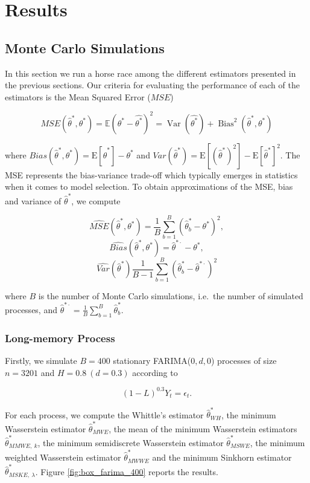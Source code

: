 \documentclass[
  11pt,
]{article}
\begin{document}
\hypertarget{results}{%
\section{Results}\label{results}}

\hypertarget{monte-carlo-simulations}{%
\subsection{Monte Carlo Simulations}\label{monte-carlo-simulations}}

In this section we run a horse race among the different estimators
presented in the previous sections. Our criteria for evaluating the
performance of each of the estimators is the Mean Squared Error
(\(MSE\))

\[MSE(\hat \theta^*, \theta^*) = \mathbb{E}(\theta^*-\hat{\theta^*})^{2} = \operatorname{Var}(\hat{\theta^*})+\operatorname{Bias}^{2}(\hat \theta^*, \theta^*)\]

where
\(Bias(\hat \theta^*, \theta^*) = \mathrm{E}[\hat \theta^*] - \theta^*\)
and
\(Var( \hat \theta^*) = \mathrm{E}[(\hat \theta^*)^2]-\mathrm{E}[\hat \theta^*]^{2}\).
The MSE represents the bias-variance trade-off which typically emerges
in statistics when it comes to model selection. To obtain approximations
of the MSE, bias and variance of \(\hat \theta^*\), we compute

\[\widehat{MSE}(\hat \theta^*, \theta^*) =  \frac{1}{B}\sum_{b = 1}^{B}(\hat \theta^*_b - \theta^*)^2,\]
\[\widehat{Bias}(\hat \theta^*, \theta^*) = \hat \theta^{* \cdot} - \theta^*,\]
\[\widehat{Var}( \hat \theta^*) \frac{1}{B - 1} \sum^{B}_{b = 1}(\hat \theta^*_b - \hat \theta^{* \cdot})^2\]

where \(B\) is the number of Monte Carlo simulations, i.e.~the number of
simulated processes, and
\(\hat \theta^{* \cdot} = \frac{1}{B} \sum^B_{b = 1} \hat \theta^*_b\).

\hypertarget{long-memory-process}{%
\subsubsection{Long-memory Process}\label{long-memory-process}}

Firstly, we simulate \(B = 400\) stationary FARIMA(\(0,d,0\)) processes
of size \(n = 3201\) and \(H = 0.8 \ (d = 0.3)\) according to

\[(1-L)^{0.3}Y_t = \epsilon_t.\]

For each process, we compute the Whittle's estimator
\(\hat \theta^*_{WH}\), the minimum Wasserstein estimator
\(\hat \theta^*_{MWE}\), the mean of the minimum Wasserstein estimators
\(\hat \theta^*_{MMWE, \ k}\), the minimum semidiscrete Wasserstein
estimator \(\hat \theta^*_{MSWE}\), the minimum weighted Wasserstein
estimator \(\hat \theta^*_{MWWE}\) and the minimum Sinkhorn estimator
\(\hat \theta^*_{MSKE,\ \lambda}\). Figure \ref{fig:box_farima_400}
reports the results.
\end{document}
